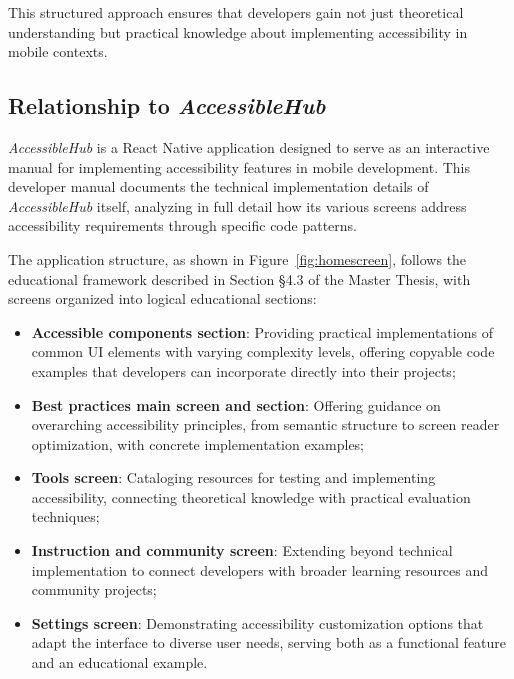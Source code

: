 This structured approach ensures that developers gain not just theoretical understanding but practical knowledge about implementing accessibility in mobile contexts.

\subsection{Relationship to \textit{AccessibleHub}}
\label{subsec:dev-relation}

\textit{AccessibleHub} is a React Native application designed to serve as an interactive manual for implementing accessibility features in mobile development. This developer manual documents the technical implementation details of \textit{AccessibleHub} itself, analyzing in full detail how its various screens address accessibility requirements through specific code patterns.

The application structure, as shown in Figure~\ref{fig:homescreen}, follows the educational framework described in Section §4.3 of the Master Thesis, with screens organized into logical educational sections:

\begin{itemize}
    \item \textbf{Accessible components section}: Providing practical implementations of common UI elements with varying complexity levels, offering copyable code examples that developers can incorporate directly into their projects;
    
    \item \textbf{Best practices main screen and section}: Offering guidance on overarching accessibility principles, from semantic structure to screen reader optimization, with concrete implementation examples;
    
    \item \textbf{Tools screen}: Cataloging resources for testing and implementing accessibility, connecting theoretical knowledge with practical evaluation techniques;
    
    \item \textbf{Instruction and community screen}: Extending beyond technical implementation to connect developers with broader learning resources and community projects;
    
    \item \textbf{Settings screen}: Demonstrating accessibility customization options that adapt the interface to diverse user needs, serving both as a functional feature and an educational example.
\end{itemize}

